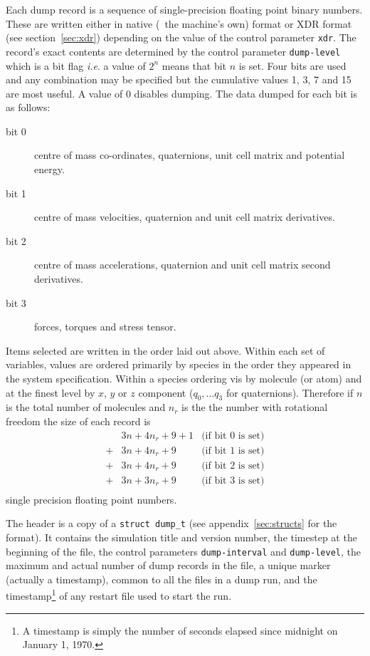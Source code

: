 Each dump record is a sequence of single-precision floating point
binary numbers.  These are written either in native (\ie\ the
machine's own) format or XDR format (see section~\ref{sec:xdr})
depending on the value of the control parameter \verb'xdr'.  The
record's exact contents are determined by the control parameter
\verb'dump-level' which is a bit flag {\em i.e}. a value of $2^{n}$
means that bit $n$ is set.  Four bits are used and any combination may
be specified but the cumulative values 1, 3, 7 and 15 are most
useful.  A value of 0 disables dumping. The data dumped for each bit
is as follows:
\begin{description}
\item[bit 0]    centre of mass co-ordinates, quaternions, unit cell matrix 
and potential energy.         
\item[bit 1]    centre of mass velocities, quaternion and unit cell
matrix derivatives.
\item[bit 2]    centre of mass accelerations, quaternion and unit cell
matrix second derivatives.
\item[bit 3]    forces, torques and stress tensor.
\end{description}
Items selected are written in the order laid out above.  Within each
set of variables, values are ordered primarily by species in the order
they appeared in the system specification.  Within a species ordering
vis by molecule (or atom) and at the finest level by $x$, $y$ or $z$
component ($q_{0}, \ldots q_{3}$ for quaternions). Therefore if $n$ is
the total number of molecules and $n_{r}$ is the the number with
rotational freedom the size of each record is
\begin{displaymath}
\begin{array}{cll}
   & 3n + 4n_{r} + 9 + 1 & \mbox{(if bit 0 is set)} \\
 + & 3n + 4n_{r} + 9 & \mbox{(if bit 1 is set)} \\
 + & 3n + 4n_{r} + 9 & \mbox{(if bit 2 is set)} \\
 + & 3n + 3n_{r} + 9 & \mbox{(if bit 3 is set)} \\
\end{array}
\end{displaymath}
single precision floating point numbers.

The header is a copy of a \verb'struct dump_t' (see
appendix~\ref{sec:structs} for the format). It contains the simulation
title and version number, the timestep at the beginning of the file,
the control parameters \verb'dump-interval' and \verb'dump-level', the
maximum and actual number of dump records in the file, a unique marker
(actually a timestamp), common to all the files in a dump run, and the
timestamp\footnote{A timestamp is simply the number of seconds elapsed
since midnight on January 1, 1970.} of any restart file used to start
the run.

